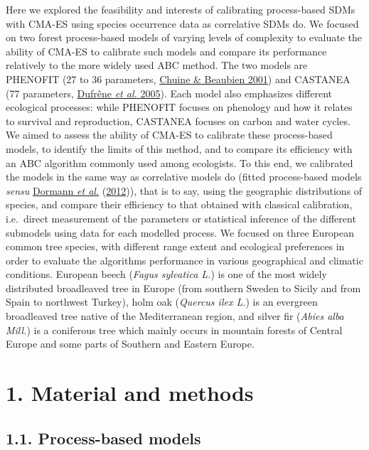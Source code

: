 \documentclass[11pt,]{article}
\begin{document}
Here we explored the feasibility and interests of calibrating
process-based SDMs with CMA-ES using species occurrence data as
correlative SDMs do. We focused on two forest process-based models of
varying levels of complexity to evaluate the ability of CMA-ES to
calibrate such models and compare its performance relatively to the more
widely used ABC method. The two models are PHENOFIT (27 to 36
parameters, \protect\hyperlink{ref-Chuine2001}{Chuine \& Beaubien 2001})
and CASTANEA (77 parameters, \protect\hyperlink{ref-Dufrene2005}{Dufrêne
\emph{et al.} 2005}). Each model also emphasizes different ecological
processes: while PHENOFIT focuses on phenology and how it relates to
survival and reproduction, CASTANEA focuses on carbon and water cycles.
We aimed to assess the ability of CMA-ES to calibrate these
process-based models, to identify the limits of this method, and to
compare its efficiency with an ABC algorithm commonly used among
ecologists. To this end, we calibrated the models in the same way as
correlative models do (fitted process-based models \emph{sensu}
\protect\hyperlink{ref-Dormann2012}{Dormann \emph{et al.}}
(\protect\hyperlink{ref-Dormann2012}{2012})), that is to say, using the
geographic distributions of species, and compare their efficiency to
that obtained with classical calibration, i.e.~direct measurement of the
parameters or statistical inference of the different submodels using
data for each modelled process. We focused on three European common tree
species, with different range extent and ecological preferences in order
to evaluate the algorithms performance in various geographical and
climatic conditions. European beech (\emph{Fagus sylvatica L.}) is one
of the most widely distributed broadleaved tree in Europe (from southern
Sweden to Sicily and from Spain to northwest Turkey), holm oak
(\emph{Quercus ilex L.}) is an evergreen broadleaved tree native of the
Mediterranean region, and silver fir (\emph{Abies alba Mill.}) is a
coniferous tree which mainly occurs in mountain forests of Central
Europe and some parts of Southern and Eastern Europe.

\hypertarget{methods}{%
\section{1. Material and methods}\label{methods}}

\hypertarget{pbmodels}{%
\subsection{1.1. Process-based models}\label{pbmodels}}
\end{document}

